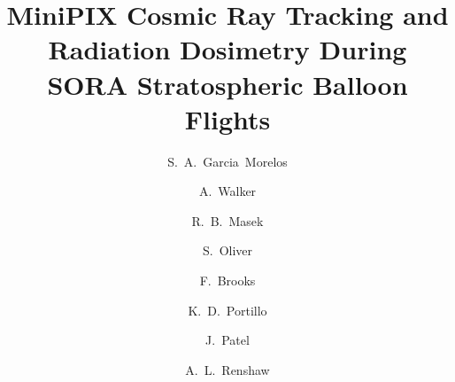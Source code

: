 \documentclass[preprint,review,12pt]{elsarticle}
\begin{document}
\begin{frontmatter}


\title{MiniPIX Cosmic Ray Tracking and Radiation Dosimetry During SORA Stratospheric Balloon Flights}


\author{S.~A.~Garcia~Morelos}%
\author{A.~Walker}%
\author{R.~B.~Masek}
\author{S.~Oliver}
\author{F.~Brooks}
\author{K.~D.~Portillo}
\author{J.~Patel}
\author{A.~L.~Renshaw}



\address[label2,label3,label4,label5,label6,label7,label8,label9,label10,label11]{Department of Physics, University of Houston, Houston, TX 77204, USA}



\end{frontmatter}
\end{document}

